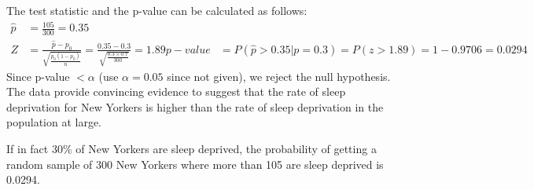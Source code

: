 {{\begin{enumerate}[1.]
\end{enumerate}
The test statistic and the p-value can be calculated as follows:
\begin{align*}
\hat{p} &= \frac{105}{300} = 0.35 \\
Z &= \frac{\hat{p} - p_0}{\sqrt{\frac{p_0 (1 - p_0)}{n}}} = \frac{0.35 - 0.3}{\sqrt{\frac{0.3 \times 0.7}{300}}} = 1.89
p-value &= P(\hat{p} > 0.35 | p = 0.3) = P(z > 1.89) = 1 - 0.9706 = 0.0294
\end{align*}
Since p-value $< \alpha$ (use $\alpha = 0.05$ since not given), we reject the null hypothesis. The data provide convincing evidence to suggest that the rate of sleep deprivation for New Yorkers is higher than the rate of sleep deprivation in the population at large.
}\label{NYsleepDeprived}
}

%

{
{If in fact 30\% of New Yorkers are sleep deprived, the probability of getting a random sample of 300 New Yorkers where more than 105 are sleep deprived is 0.0294.}
}

%

